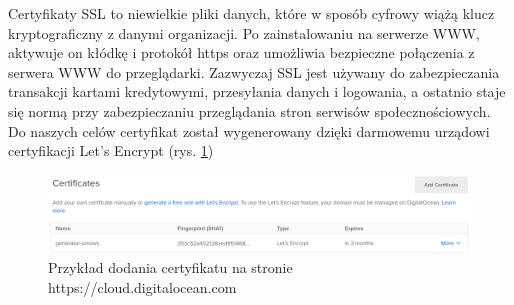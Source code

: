 Certyfikaty SSL to niewielkie pliki danych, które w sposób cyfrowy wiążą klucz kryptograficzny z danymi organizacji. Po zainstalowaniu na serwerze WWW, aktywuje on kłódkę i protokół https oraz umożliwia bezpieczne połączenia z serwera WWW do przeglądarki. Zazwyczaj SSL jest używany do zabezpieczania transakcji kartami kredytowymi, przesyłania danych i logowania, a ostatnio staje się normą przy zabezpieczaniu przeglądania stron serwisów społecznościowych.
Do naszych celów certyfikat został wygenerowany dzięki darmowemu urządowi certyfikacji Let's Encrypt (rys. \ref{fig:ssl})

\begin{figure}[!ht]
    \centering
    \includegraphics[width=6in]{images/ssl.png}
    \caption{Przykład dodania certyfikatu na stronie https://cloud.digitalocean.com \label{fig:ssl}}
\end{figure}